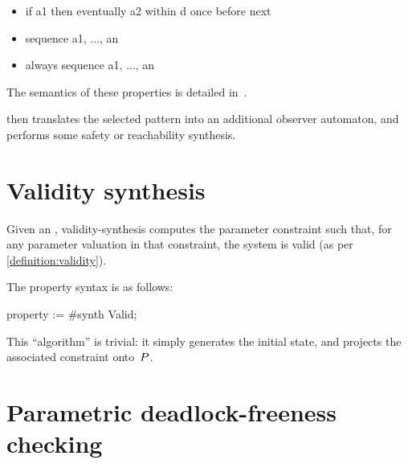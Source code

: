 \begin{itemize}
	\item
\begin{IMITATORproperty}
if a1 then eventually a2 within d once before next
\end{IMITATORproperty}

	\item
\begin{IMITATORproperty}
sequence a1, ..., an
\end{IMITATORproperty}

	\item
\begin{IMITATORproperty}
always sequence a1, ..., an
\end{IMITATORproperty}

\end{itemize}

The semantics of these properties is detailed in~\cite{Andre13ICECCS}.

\imitator{} then translates the selected pattern into an additional observer automaton, and performs some safety or reachability synthesis.


\section{Validity synthesis}\label{ss:mode:validity}

Given an \NIPTA{}, validity-synthesis computes the parameter constraint such that, for any parameter valuation in that constraint, the system is valid (as per \cref{definition:validity}).

The property syntax is as follows:

\begin{IMITATORproperty}
property := #synth Valid;
\end{IMITATORproperty}

This ``algorithm'' is trivial: it simply generates the initial state, and projects the associated constraint onto~$P$.



\section{Parametric deadlock-freeness checking}\label{ss:mode:PDFC}

